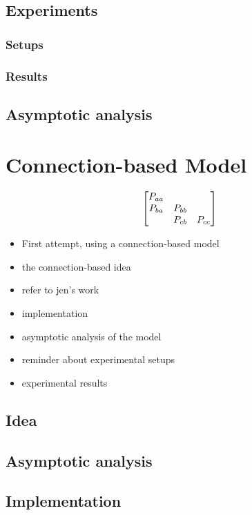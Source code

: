 \documentclass[11pt,a4paper]{article}
\begin{document}
\subsection{Experiments}
\subsubsection{Setups}
\subsubsection{Results}
\subsection{Asymptotic analysis}

\section{Connection-based Model}
\label{cha:conn-based-model}

\[
\begin{bmatrix}
  P_{aa} & \empty & \empty\\
  P_{ba} & P_{bb} & \empty\\
  \empty & P_{cb} & P_{cc}
\end{bmatrix}
\]

\begin{itemize}
\item First attempt, using a connection-based model
\item the connection-based idea
\item refer to jen's work
\item implementation
\item asymptotic analysis of the model
\item reminder about experimental setups
\item experimental results
\end{itemize}

\subsection{Idea}
\subsection{Asymptotic analysis}
\subsection{Implementation}
\end{document}
